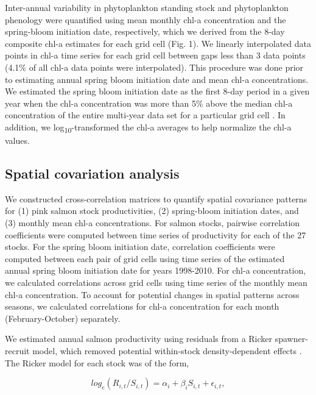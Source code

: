 Inter-annual variability in phytoplankton standing stock and phytoplankton
phenology were quantified using mean monthly chl-a concentration and the
spring-bloom initiation date, respectively, which we derived from the 8-day
composite chl-a estimates for each grid cell (Fig. 1). We linearly interpolated
data points in chl-a time series for each grid cell between gaps less than 3
data points (4.1\% of all chl-a data points were interpolated). This procedure
was done prior to estimating annual spring bloom initiation date and mean chl-a
concentrations. We estimated the spring bloom initiation date as the first 8-day
period in a given year when the chl-a concentration was more than 5\% above the
median chl-a concentration of the entire multi-year data set for a particular
grid cell \citep{Siegel2002a, Henson2007a}. In addition, we
log\textsubscript{10}-transformed the chl-a averages to help normalize the chl-a
values.


\subsection{Spatial covariation analysis}

We constructed cross-correlation matrices to quantify spatial covariance
patterns for (1) pink salmon stock productivities, (2) spring-bloom initiation
dates, and (3) monthly mean chl-a concentrations. For salmon stocks, pairwise
correlation coefficients were computed between time series of productivity for
each of the 27 stocks. For the spring bloom initiation date, correlation
coefficients were computed between each pair of grid cells using time series of
the estimated annual spring bloom initiation date for years 1998-2010. For chl-a
concentration, we calculated correlations across grid cells using time series of
the monthly mean chl-a concentration. To account for potential changes in
spatial patterns across seasons, we calculated correlations for chl-a
concentration for each month (February-October) separately.

We estimated annual salmon productivity using residuals from a Ricker
spawner-recruit model, which removed potential within-stock
density-dependent effects \citep{Pyper2001a, Mueter2002a, Ricker1954a}.
The Ricker model for each stock was of the form,

\begin{equation}
log_e(R_{i,t} / S_{i,t}) = \alpha_i + \beta_i S_{i,t} + \epsilon_{i,t},
\label{eq:bloom:1}
\end{equation}

